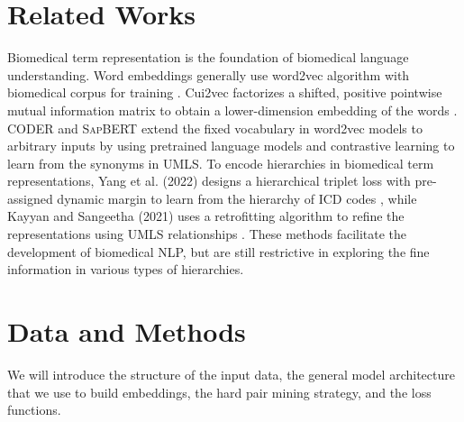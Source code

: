 \documentclass[12pt,a4paper]{cibb}
\begin{document}
\section{Related Works}
Biomedical term representation is the foundation of biomedical language understanding. Word embeddings generally use word2vec algorithm with biomedical corpus for training \cite{Mikolov2013DistributedRO}. Cui2vec factorizes a shifted, positive pointwise mutual information matrix to obtain a lower-dimension embedding of the words \cite{Beam2018ClinicalCE}. CODER and \textsc{SapBERT} extend the fixed vocabulary in word2vec models to arbitrary inputs by using pretrained language models and contrastive learning to learn from the synonyms in UMLS. To encode hierarchies in biomedical term representations, Yang et al. (2022) designs a hierarchical triplet loss with pre-assigned dynamic margin to learn from the hierarchy of ICD codes \cite{yang_knowledge_2022}, while Kayyan and Sangeetha (2021) uses a retrofitting algorithm to refine the representations using UMLS relationships \cite{kalyan_hybrid_2021}. These methods facilitate the development of biomedical NLP, but are still restrictive in exploring the fine information in various types of hierarchies.


\section{\bf Data and Methods}
\label{sec:DATA-AND-METHODS}
We will introduce the structure of the input data, the general model architecture that we use to build embeddings, the hard pair mining strategy, and the loss functions.
\end{document}
